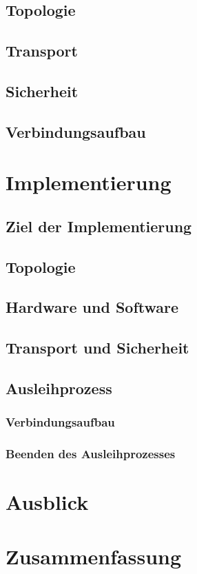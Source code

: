 \documentclass[doktyp=barbeit]{TUBAFarbeiten}
\begin{document}
	\subsection{Topologie}

	\subsection{Transport}

	\subsection{Sicherheit}

	\subsection{Verbindungsaufbau}

\newpage
\section{Implementierung}

	\subsection{Ziel der Implementierung}

	\subsection{Topologie}

	\subsection{Hardware und Software}

	\subsection{Transport und Sicherheit}

	\subsection{Ausleihprozess}

		\subsubsection{Verbindungsaufbau}

		\subsubsection{Beenden des Ausleihprozesses}

\newpage
\section{Ausblick}

\newpage
\section{Zusammenfassung}

\newpage
\printbibliography[heading=bibintoc]
\end{document}
